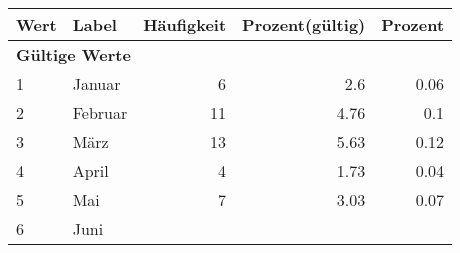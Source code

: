      \begin{longtable}{lXrrr}
     \toprule
     \textbf{Wert} & \textbf{Label} & \textbf{Häufigkeit} & \textbf{Prozent(gültig)} & \textbf{Prozent} \\
     \endhead
     \midrule
     \multicolumn{5}{l}{\textbf{Gültige Werte}}\\

     1 &
     \multicolumn{1}{X}{ Januar   } &


       \num{6} &
       \num[round-mode=places,round-precision=2]{2,6} &
         \num[round-mode=places,round-precision=2]{0,06} \\

     2 &
     \multicolumn{1}{X}{ Februar   } &


       \num{11} &
       \num[round-mode=places,round-precision=2]{4,76} &
         \num[round-mode=places,round-precision=2]{0,1} \\

     3 &
     \multicolumn{1}{X}{ März   } &


       \num{13} &
       \num[round-mode=places,round-precision=2]{5,63} &
         \num[round-mode=places,round-precision=2]{0,12} \\

     4 &
     \multicolumn{1}{X}{ April   } &


       \num{4} &
       \num[round-mode=places,round-precision=2]{1,73} &
         \num[round-mode=places,round-precision=2]{0,04} \\

     5 &
     \multicolumn{1}{X}{ Mai   } &


       \num{7} &
       \num[round-mode=places,round-precision=2]{3,03} &
         \num[round-mode=places,round-precision=2]{0,07} \\

     6 &
     \multicolumn{1}{X}{ Juni   } &



\end{longtable}
